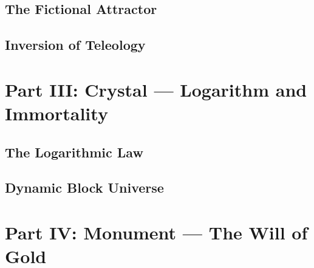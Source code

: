 \documentclass[11pt,a4paper,twoside]{book}
\begin{document}
\chapter{The Fictional Attractor}




\chapter{Inversion of Teleology}




\part{Part III: Crystal --- Logarithm and Immortality}


\chapter{The Logarithmic Law}




\chapter{Dynamic Block Universe}




\part{Part IV: Monument --- The Will of Gold}

\end{document}
